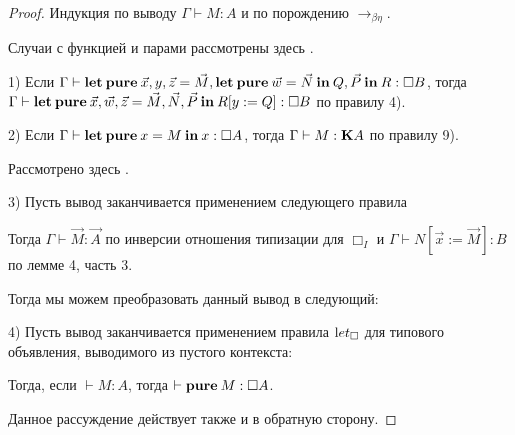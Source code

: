 \begin{proof}

Индукция по выводу $\Gamma \vdash M : A$ и по порождению $\rightarrow_{\beta \eta}$.

Случаи с функцией и парами рассмотрены здесь \cite{Morten} \cite{Pierce}.

1) Если $\Gamma \vdash {\bf let \: pure \:} \vec{x}, y, \vec{z} = \vec{M}, {\bf let \: pure \: } \vec{w} = \vec{N} {\bf \: in \: } Q, \vec{P}  {\: \bf in \:} R : \Box B$,
тогда $\Gamma \vdash {\bf let \: pure \:} \vec{x}, \vec{w}, \vec{z} = \vec{M}, \vec{N}, \vec{P} \: { \bf in } \: R [y := Q] : \Box B$ по правилу 4).

2) Если $\Gamma \vdash {\bf let \: pure \:} x = M {\: \bf in \: } x : \Box A$, тогда $\Gamma \vdash M : {\bf K}A$ по правилу 9).

Рассмотрено здесь \cite{ModalK}.

3) Пусть вывод заканчивается применением следующего правила

\begin{prooftree}
\end{prooftree}

Тогда $\Gamma \vdash \vec{M} : \vec{A}$ по инверсии отношения типизации для $\Box_I$ и $\Gamma \vdash N [\vec{x} := \vec{M}] : B$ по лемме 4, часть 3.

Тогда мы можем преобразовать данный вывод в следующий:

\begin{prooftree}
\end{prooftree}

4) Пусть вывод заканчивается применением правила ${\text let}_{\Box}$ для типового объявления, выводимого из пустого контекста:

\begin{prooftree}
\end{prooftree}

Тогда, если $\vdash M : A$, тогда $\vdash {\bf pure \:} M : \Box A$.

Данное рассуждение действует также и в обратную сторону.
\end{proof}

